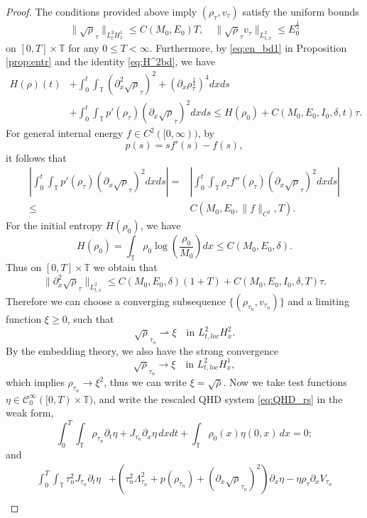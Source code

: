 \documentclass[leqno]{amsart}
\theoremstyle{plain}
\theoremstyle{definition}
\theoremstyle{remark}
\theoremstyle{plain}
\theoremstyle{plain}
\def\T{{\mathbb T}}%
\def\d{{\partial}}
\numberwithin{equation}{section}
\begin{document}
\begin{proof}
The conditions provided above imply $(\rho_\tau,v_\tau)$ satisfy the uniform bounds
\begin{equation}\label{eq:prop29.1}
\|\sqrt\rho_\tau\|_{L^2_tH^1_x}\leq C(M_0,E_0)T,\quad \|\sqrt\rho_\tau v_\tau\|_{L^2_{t,x}}\leq E_0^\frac12
\end{equation}
on $[0,T]\times \T$ for any $0\leq T<\infty$.
Furthermore, by \eqref{eq:en_bd1} in Proposition \ref{prop:entr} and the identity \eqref{eq:H^2bd}, we have
\begin{equation}\label{eq:7-1}
\begin{aligned}
H(\rho)(t)&+\int_0^t\int_\T(\d_x^2\sqrt\rho_\tau)^2+(\d_x\rho_\tau^\frac14)^4dxds\\
&+\int_0^t\int_\T p'(\rho_\tau)(\d_x\sqrt\rho_\tau)^2dxds\leq H(\rho_0)+C(M_0,E_0,I_0,\delta,t)\tau.
\end{aligned}
\end{equation}
For general internal energy $f\in C^2([0,\infty))$, by
\[
p(s)=s f'(s)-f(s),
\]
it follows that
\begin{align*}
\left|\int_0^t\int_\T p'(\rho_\tau)(\d_x\sqrt\rho_\tau)^2dxds\right|=&\left|\int_0^t\int_\T \rho_\tau f''(\rho_\tau)(\d_x\sqrt\rho_\tau)^2dxds\right|\\
\leq & C(M_0,E_0,\|f\|_{C^2},T).
\end{align*}
For the initial entropy $H(\rho_0)$, we have
\[
H(\rho_0)=\int_\T \rho_0\log\left(\frac{\rho_0}{M_0}\right)dx\leq C(M_0,E_0,\delta).
\]
Thus on $[0,T]\times \T$ we obtain that
\[
\|\d_x^2\sqrt\rho_\tau\|_{L^2_{t,x}}\leq C(M_0,E_0,\delta)(1+T)+C(M_0,E_0,I_0,\delta,T)\tau.
\]
Therefore we can choose a converging subsequence $\{(\rho_{\tau_n},v_{\tau_n})\}$ and a limiting function $\xi\geq 0$, such that
\[
\sqrt\rho_{\tau_n}\rightharpoonup\xi\quad\textrm{in }L^2_{t,loc}H^2_x.
\]
By the embedding theory, we also have the strong convergence
\[
\sqrt\rho_{\tau_n}\to\xi\quad\textrm{in }L^2_{t,loc}H^1_x,
\]
which implies $\rho_{\tau_n}\to \xi^2$,  thus we can write $\xi=\sqrt{\bar\rho}$. Now we take test functions $\eta\in\mathcal C^\infty_0([0, T)\times\T)$, and write the rescaled QHD system \eqref{eq:QHD_rs} in the weak form,
\[
\int_0^T\int_{\T}\rho_{\tau_n}\d_t\eta+J_{\tau_n}\d_x\eta\,dxdt+\int_{\T}\rho_0(x)\eta(0, x)\,dx=0;
\]
and
\begin{align*}
\int_0^T\int_{\T}\tau_n^2J_{\tau_n}\d_t\eta&+(\tau_n^2\Lambda_{\tau_n}^2+p(\rho_{\tau_n})+(\d_x\sqrt\rho_{\tau_n})^2)\d_x\eta-\eta\rho_\tau\d_xV_{\tau_n}
\\

\end{align*}
\end{proof}
\end{document}
